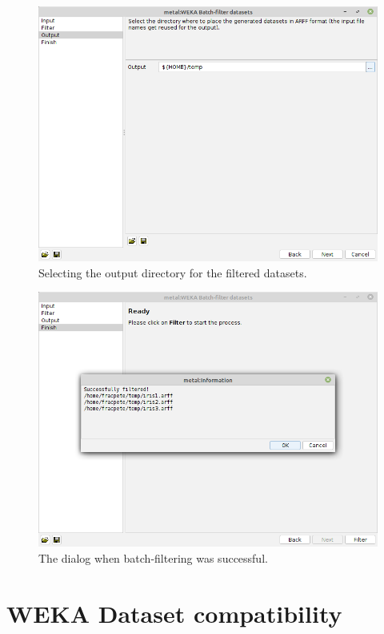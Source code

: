 \begin{figure}[htb]
  \centering
  \includegraphics[width=12.0cm]{images/batchfilter_datasets3.png}
  \caption{Selecting the output directory for the filtered datasets.}
  \label{batchfilter_datasets3}
\end{figure}

\begin{figure}[htb]
  \centering
  \includegraphics[width=12.0cm]{images/batchfilter_datasets4.png}
  \caption{The dialog when batch-filtering was successful.}
  \label{batchfilter_datasets4}
\end{figure}

\clearpage
\section{WEKA Dataset compatibility}

